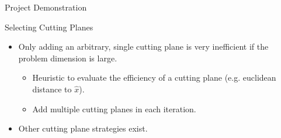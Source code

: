 \begin{frame}{Project Demonstration}

%    
\end{frame}

\begin{frame}{Selecting Cutting Planes}
\begin{itemize}[<+->]
\item Only adding an arbitrary, single cutting plane is very inefficient if the problem dimension is large.
\begin{itemize}
\item Heuristic to evaluate the efficiency of a cutting plane (e.g. euclidean distance to $\hat{x}$).
\item Add multiple cutting planes in each iteration.
\end{itemize}
\item Other cutting plane strategies exist.
\end{itemize}
\end{frame}